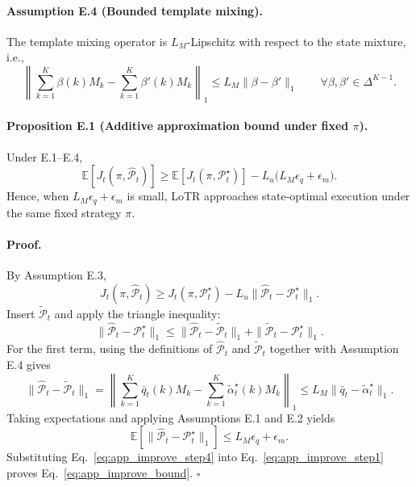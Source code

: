 \paragraph{Assumption E.4 (Bounded template mixing).}
The template mixing operator is \(L_M\)-Lipschitz with respect to the state mixture, i.e.,
\begin{equation}
\left\|
\sum_{k=1}^{K}\beta(k)M_k-\sum_{k=1}^{K}\beta'(k)M_k
\right\|_1
\le
L_M\|\beta-\beta'\|_1
\qquad
\forall \beta,\beta'\in\Delta^{K-1}.
\label{eq:app_improve_mix_lipschitz}
\end{equation}

\paragraph{Proposition E.1 (Additive approximation bound under fixed \(\pi\)).}
Under E.1--E.4,
\begin{equation}
\mathbb{E}[J_t(\pi,\widehat{\mathcal{P}}_t)]
\ge
\mathbb{E}[J_t(\pi,\mathcal{P}_t^\star)]
-
L_u\bigl(L_M\epsilon_q+\epsilon_m\bigr).
\label{eq:app_improve_bound}
\end{equation}
Hence, when \(L_M\epsilon_q+\epsilon_m\) is small, LoTR approaches state-optimal execution under the same fixed strategy \(\pi\).

\paragraph{Proof.}
By Assumption E.3,
\begin{equation}
J_t(\pi,\widehat{\mathcal{P}}_t)
\ge
J_t(\pi,\mathcal{P}_t^\star)
-
L_u\|\widehat{\mathcal{P}}_t-\mathcal{P}_t^\star\|_1.
\label{eq:app_improve_step1}
\end{equation}
Insert \(\widetilde{\mathcal{P}}_t\) and apply the triangle inequality:
\begin{equation}
\|\widehat{\mathcal{P}}_t-\mathcal{P}_t^\star\|_1
\le
\|\widehat{\mathcal{P}}_t-\widetilde{\mathcal{P}}_t\|_1
+
\|\widetilde{\mathcal{P}}_t-\mathcal{P}_t^\star\|_1.
\label{eq:app_improve_step2}
\end{equation}
For the first term, using the definitions of \(\widehat{\mathcal{P}}_t\) and \(\widetilde{\mathcal{P}}_t\) together with Assumption E.4 gives
\begin{equation}
\|\widehat{\mathcal{P}}_t-\widetilde{\mathcal{P}}_t\|_1
=
\left\|
\sum_{k=1}^{K}\bar q_t(k)M_k
-
\sum_{k=1}^{K}\tilde{\alpha}_t^\star(k)M_k
\right\|_1
\le
L_M\|\bar q_t-\tilde{\alpha}_t^\star\|_1.
\label{eq:app_improve_step3}
\end{equation}
Taking expectations and applying Assumptions E.1 and E.2 yields
\begin{equation}
\mathbb{E}\!\left[\|\widehat{\mathcal{P}}_t-\mathcal{P}_t^\star\|_1\right]
\le
L_M\epsilon_q+\epsilon_m.
\label{eq:app_improve_step4}
\end{equation}
Substituting Eq.~\eqref{eq:app_improve_step4} into Eq.~\eqref{eq:app_improve_step1} proves Eq.~\eqref{eq:app_improve_bound}. \(\square\)

